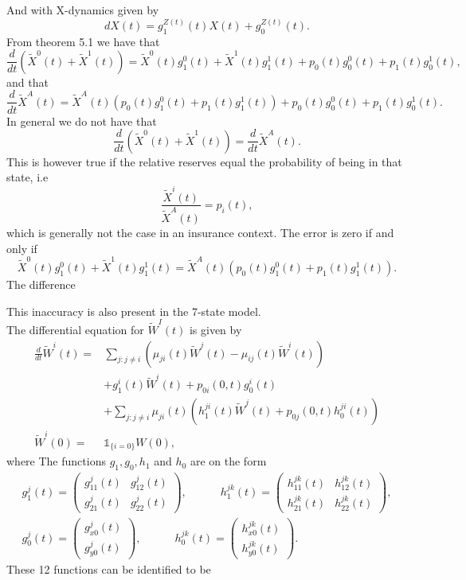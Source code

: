 \documentclass[12pt]{article}
\newcommand{\indic}[1]{\mathds{1}_{ \{ #1 \} }}
\newcommand{\noin}{\noindent}
\theoremstyle{my_thm}
\theoremstyle{my_def}
\theoremstyle{my_thm2}
\begin{document}
\noin And with X-dynamics given by
$$
dX(t)=g^{Z(t)}_1(t)X(t)+g^{Z(t)}_0(t).
$$
From theorem 5.1 we have that
$$
\frac{d}{dt}(\tilde{X}^0(t)+\tilde{X}^1(t))=\tilde{X}^0(t)g_1^0(t)+\tilde{X}^1(t)g_1^1(t)+p_0(t)g_0^0(t)+p_1(t)g_0^1(t),
$$
and that
$$
\frac{d}{dt}\tilde{X}^A(t)=\tilde{X}^A(t)\left( p_0(t)g_1^0(t)+p_1(t)g_1^1(t) \right) + p_0(t)g_0^0(t)+p_1(t)g_0^1(t).
$$
In general we do not have that 
$$
\frac{d}{dt}(\tilde{X}^0(t)+\tilde{X}^1(t)) =  \frac{d}{dt}\tilde{X}^A(t).
$$
This is however true if the relative reserves equal the probability of being in that state, i.e 
$$
\frac{\tilde{X}^i(t)}{\tilde{X}^A(t)}=p_i(t)
,
$$
which is generally not the case in an insurance context. The error is zero if and only if
$$
\tilde{X}^0(t)g_1^0(t)+\tilde{X}^1(t)g_1^1(t)=\tilde{X}^A(t)\left( p_0(t)g_1^0(t)+p_1(t)g_1^1(t) \right).
$$
The difference 


This inaccuracy is also present in the 7-state model.
\\[12pt]
The differential equation for $\tilde{W}^I(t)$ is given by
\begin{align*}
\frac{d}{dt}\tilde{W}^i(t)=&
\sum_{j:j \neq i} \left( \mu_{ji}(t) \tilde{W}^j(t)-\mu_{ij}(t)\tilde{W}^i(t)\right)
 \\
&+
g_1^i(t) \tilde{W}^i(t) +p_{0i}(0,t)g_0^i(t)
\\
&+
\sum_{j:j\neq i} \mu_{ji}(t) \left( h_1^{ji}(t) \tilde{W}^j(t)  + p_{0j}(0,t)h_0^{ji}(t)\right) 
\\
\tilde{W}^i(0)=&\indic{i=0}W(0) ,
\end{align*}
where
The functions $g_1,g_0,h_1$ and $h_0$ are on the form
\begin{gather*}
g^j_1(t)=\begin{pmatrix}
g^j_{11}(t) & g^j_{12}(t) \\
g^j_{21}(t) & g^j_{22}(t)
\end{pmatrix},
\qquad 
\quad
h^{jk}_1(t)=\begin{pmatrix}
h^{jk}_{11}(t) & h^{jk}_{12}(t) \\
h^{jk}_{21}(t) & h^{jk}_{22}(t)
\end{pmatrix},
\\
g_0^j(t)=\begin{pmatrix}
g^j_{x0}(t) \\
g^j_{y0}(t)
\end{pmatrix},
\qquad 
\quad
h^{jk}_0(t)=\begin{pmatrix}
h^{jk}_{x0}(t) \\
h^{jk}_{y0}(t)
\end{pmatrix}.
\end{gather*}
These 12 functions can be identified to be
\end{document}
